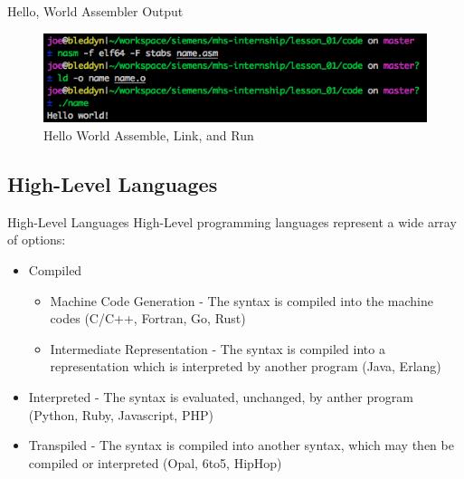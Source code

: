 \documentclass[serif,mathserif,compress]{beamer}
\begin{document}
\begin{frame}[fragile]{Hello, World Assembler Output}
  \begin{figure}
  \centering
  \includegraphics[width=\textwidth]{images/hello-world-asm.png}
  \caption{Hello World Assemble, Link, and Run}
  \label{fig:hello-world-asm-output}
  \end{figure}
\end{frame}

\subsection{High-Level Languages}

\begin{frame}{High-Level Languages}
  High-Level programming languages represent a wide array of options:
  \begin{itemize}[<+->]
    \item Compiled
    \begin{itemize}[<+->]
      \item Machine Code Generation - The syntax is compiled into the machine codes (C/C++, Fortran, Go, Rust)
      \item Intermediate Representation - The syntax is compiled into a representation which is interpreted by another program (Java, Erlang)
    \end{itemize}
    \item Interpreted - The syntax is evaluated, unchanged, by anther program (Python, Ruby, Javascript, PHP)
    \item Transpiled - The syntax is compiled into another syntax, which may then be compiled or interpreted (Opal, 6to5, HipHop)
  \end{itemize}
\end{frame}
\end{document}
